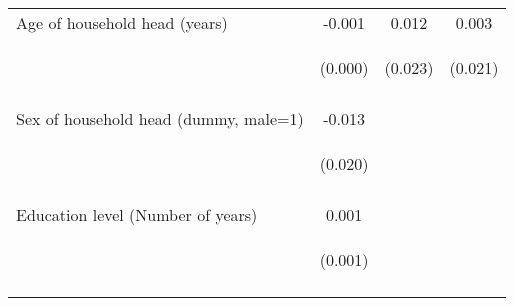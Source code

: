 \begin{center}
\begin{tabular}{lccc}
Age of household head (years) & -0.001 & 0.012 & 0.003 \\
 & \begin{footnotesize}(0.000)\end{footnotesize} & \begin{footnotesize}(0.023)\end{footnotesize} & \begin{footnotesize}(0.021)\end{footnotesize} \\
\vspace{4pt} & \begin{footnotesize}[0.119]\end{footnotesize} & \begin{footnotesize}[0.604]\end{footnotesize} & \begin{footnotesize}[0.867]\end{footnotesize} \\
Sex of household head (dummy, male=1) & -0.013 &  &  \\
 & \begin{footnotesize}(0.020)\end{footnotesize} & \begin{footnotesize}\end{footnotesize} & \begin{footnotesize}\end{footnotesize} \\
\vspace{4pt} & \begin{footnotesize}[0.521]\end{footnotesize} & \begin{footnotesize}\end{footnotesize} & \begin{footnotesize}\end{footnotesize} \\
Education level (Number of years) & 0.001 &  &  \\
 & \begin{footnotesize}(0.001)\end{footnotesize} & \begin{footnotesize}\end{footnotesize} & \begin{footnotesize}\end{footnotesize} \\
\vspace{4pt} & \begin{footnotesize}[0.312]\end{footnotesize} & \begin{footnotesize}\end{footnotesize} & \begin{footnotesize}\end{footnotesize} \\

\end{tabular}
\end{center}
